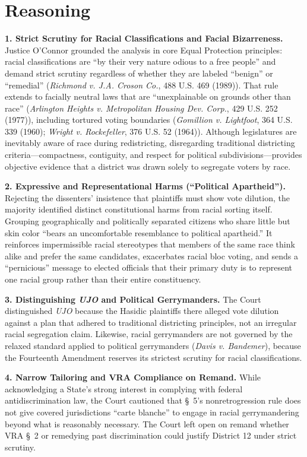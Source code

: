 \documentclass[12pt]{article}
\begin{document}
\section{Reasoning}
\textbf{1. Strict Scrutiny for Racial Classifications and Facial Bizarreness.} Justice O'Connor grounded the analysis in core Equal Protection principles: racial classifications are ``by their very nature odious to a free people'' and demand strict scrutiny regardless of whether they are labeled ``benign'' or ``remedial'' (\textit{Richmond v. J.A. Croson Co.}, 488 U.S. 469 (1989)). That rule extends to facially neutral laws that are ``unexplainable on grounds other than race'' (\textit{Arlington Heights v. Metropolitan Housing Dev. Corp.}, 429 U.S. 252 (1977)), including tortured voting boundaries (\textit{Gomillion v. Lightfoot}, 364 U.S. 339 (1960); \textit{Wright v. Rockefeller}, 376 U.S. 52 (1964)). Although legislatures are inevitably aware of race during redistricting, disregarding traditional districting criteria---compactness, contiguity, and respect for political subdivisions---provides objective evidence that a district was drawn solely to segregate voters by race.

\textbf{2. Expressive and Representational Harms (``Political Apartheid'').} Rejecting the dissenters' insistence that plaintiffs must show vote dilution, the majority identified distinct constitutional harms from racial sorting itself. Grouping geographically and politically separated citizens who share little but skin color ``bears an uncomfortable resemblance to political apartheid.'' It reinforces impermissible racial stereotypes that members of the same race think alike and prefer the same candidates, exacerbates racial bloc voting, and sends a ``pernicious'' message to elected officials that their primary duty is to represent one racial group rather than their entire constituency.

\textbf{3. Distinguishing \textit{UJO} and Political Gerrymanders.} The Court distinguished \textit{UJO} because the Hasidic plaintiffs there alleged vote dilution against a plan that adhered to traditional districting principles, not an irregular racial segregation claim. Likewise, racial gerrymanders are not governed by the relaxed standard applied to political gerrymanders (\textit{Davis v. Bandemer}), because the Fourteenth Amendment reserves its strictest scrutiny for racial classifications.

\textbf{4. Narrow Tailoring and VRA Compliance on Remand.} While acknowledging a State's strong interest in complying with federal antidiscrimination law, the Court cautioned that \S~5's nonretrogression rule does not give covered jurisdictions ``carte blanche'' to engage in racial gerrymandering beyond what is reasonably necessary. The Court left open on remand whether VRA \S~2 or remedying past discrimination could justify District 12 under strict scrutiny.
\end{document}
